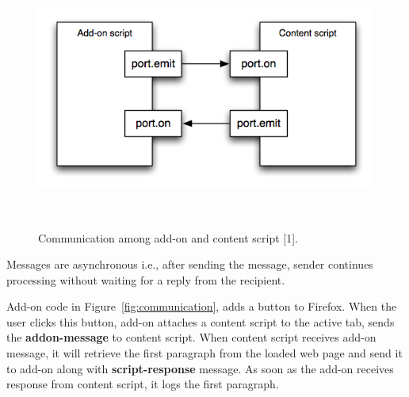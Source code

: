 \begin{figure}
  \centering
      \includegraphics[width=16cm, height=8.65cm]{content-scripting-overview.png}
    \caption[Communication among add-on and content script]{Communication among add-on and content script [1].}
    \label{fig:content-scripting-overview}
\end{figure}

Messages are asynchronous i.e., after sending the message, sender continues processing without waiting for a reply from the recipient.

Add-on code in Figure~\ref{fig:communication}, adds a button to Firefox. When the user clicks this button, add-on attaches a content script to the active tab, sends the \textbf{addon-message} to content script. When content script receives add-on message, it will retrieve the first paragraph from the loaded web page and send it to add-on along with \textbf{script-response} message. As soon as the add-on receives response from content script, it logs the first paragraph.


